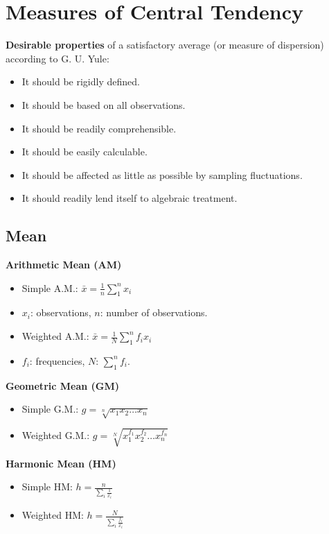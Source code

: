 \section*{Measures of Central Tendency}

\textbf{Desirable properties} of a satisfactory average (or measure of dispersion) according to G. U. Yule:

\begin{itemize}
    \item It should be rigidly defined.
    \item It should be based on all observations.
    \item It should be readily comprehensible.
    \item It should be easily calculable.    
    \item It should be affected as little as possible by sampling fluctuations.
    \item It should readily lend itself to algebraic treatment.
\end{itemize}

\subsection*{Mean}
\textbf{Arithmetic Mean (AM)}

\begin{itemize}
    \item Simple A.M.: $ \bar{x} = \frac{1}{n}\sum_1^n x_i $
    \item $x_i$: observations, $n$: number of observations.
    \item Weighted A.M.: $ \bar{x} = \frac{1}{N}\sum_1^n f_i x_i $
    \item $f_i$: frequencies, $N$: $\sum_1^n f_i$.
\end{itemize}

\textbf{Geometric Mean (GM)}

\begin{itemize}
    \item Simple G.M.: $ g = \sqrt[n]{x_1 x_2 \dots x_n}$
    \item Weighted G.M.: $ g = \sqrt[N]{x_1^{f_1} x_2^{f_2} \dots x_n^{f_n}} $
\end{itemize}

\textbf{Harmonic Mean (HM)}
\begin{itemize}
    \item Simple HM: $ h = \frac{n}{\sum_i \frac{1}{x_i}} $
    \item Weighted HM: $ h = \frac{N}{\sum_i \frac{f_i}{x_i}} $
\end{itemize}

